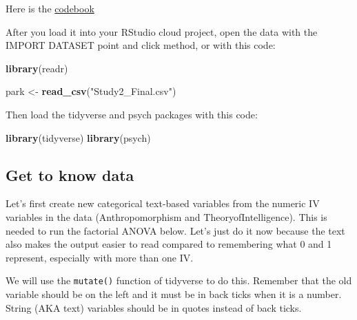 \documentclass[
]{book}
\newenvironment{Shaded}{\begin{snugshade}}{\end{snugshade}}
\newcommand{\DataTypeTok}[1]{\textcolor[rgb]{0.13,0.29,0.53}{#1}}
\newcommand{\KeywordTok}[1]{\textcolor[rgb]{0.13,0.29,0.53}{\textbf{#1}}}
\newcommand{\NormalTok}[1]{#1}
\newcommand{\OperatorTok}[1]{\textcolor[rgb]{0.81,0.36,0.00}{\textbf{#1}}}
\newcommand{\StringTok}[1]{\textcolor[rgb]{0.31,0.60,0.02}{#1}}
\begin{document}
Here is the \href{https://osf.io/ys9a5/}{codebook}

After you load it into your RStudio cloud project, open the data with the IMPORT DATASET point and click method, or with this code:

\begin{Shaded}
\begin{Highlighting}[]
\KeywordTok{library}\NormalTok{(readr)}

\NormalTok{park <-}\StringTok{ }\KeywordTok{read_csv}\NormalTok{(}\StringTok{"Study2_Final.csv"}\NormalTok{)}
\end{Highlighting}
\end{Shaded}

Then load the tidyverse and psych packages with this code:

\begin{Shaded}
\begin{Highlighting}[]
\KeywordTok{library}\NormalTok{(tidyverse)}
\KeywordTok{library}\NormalTok{(psych)}
\end{Highlighting}
\end{Shaded}

\hypertarget{get-to-know-data-1}{%
\subsection{Get to know data}\label{get-to-know-data-1}}

Let's first create new categorical text-based variables from the numeric IV variables in the data (Anthropomorphism and TheoryofIntelligence). This is needed to run the factorial ANOVA below. Let's just do it now because the text also makes the output easier to read compared to remembering what 0 and 1 represent, especially with more than one IV.

We will use the \texttt{mutate()} function of tidyverse to do this. Remember that the old variable should be on the left and it must be in back ticks when it is a number. String (AKA text) variables should be in quotes instead of back ticks.

\begin{Shaded}
\end{Shaded}
\end{document}
